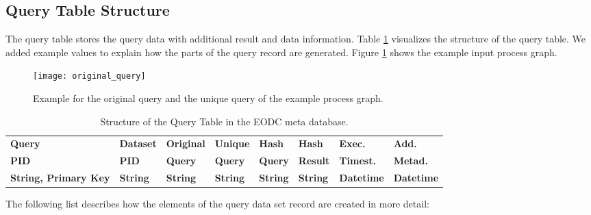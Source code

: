 \documentclass[draft,final]{vutinfth} %
\begin{document}
\subsection{Query Table Structure}

The query table stores the query data with additional result and data information. Table \ref{Tab:querytable} visualizes the structure of the query table. We added example values to explain how the parts of the query record are generated. Figure \ref{fig:processgraph_example} shows the example input process graph.   

\begin{figure}[h]
	\centering
	\texttt{[image: original\_query]}
	\caption{Example for the original query and the unique query of the example process graph.}
	\label{fig:processgraph_example} %
\end{figure} 

\begin{table}[]
	\caption{Structure of the Query Table in the EODC meta database.}
	\begin{tabular}{|l|l|l|l|l|l|l|l|}
	\hline	\textbf{Query} & \textbf{Dataset} & \textbf{Original} & \textbf{Unique} & \textbf{Hash} & \textbf{Hash} &
		\textbf{Exec.} & \textbf{Add.}  \\ 
		\textbf{PID} & \textbf{PID} & \textbf{Query} & \textbf{Query} & \textbf{Query} & \textbf{Result} &
		\textbf{Timest.} & \textbf{Metad.}  \\ \hline
		\textbf{String, Primary Key} & \textbf{String} & \textbf{String} & \textbf{String} & \textbf{String} & \textbf{String} &
		\textbf{Datetime} & \textbf{Datetime} \\ \hline
	\end{tabular}
	\label{Tab:querytable}
\end{table}
The following list describes how the elements of the query data set record are created in more detail:
\end{document}

